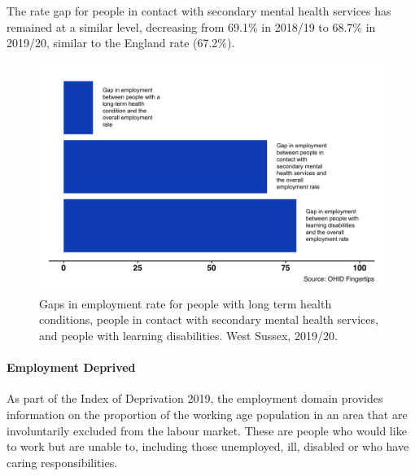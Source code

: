 The rate gap for people in contact with secondary mental health services has remained at a similar level, decreasing from 69.1\% in 2018/19 to 68.7\% in 2019/20, similar to the England rate (67.2\%).


\begin{figure}[htp]
    \caption[Gaps in employment rate, West Sussex 2019/20.]{Gaps in employment rate for people with long term health conditions, people in contact with secondary mental health services, and people with learning disabilities. West Sussex, 2019/20.}\label{fig:emp_gaps}
    \centering
	\includegraphics[width=.9\linewidth]{images/employment_gaps.png}
\end{figure}

\paragraph{Employment Deprived} As part of the Index of Deprivation 2019, the employment domain provides information on the proportion of the working age population in an area that are involuntarily excluded from the labour market. These are people who would like to work but are unable to, including those unemployed, ill, disabled or who have caring responsibilities.

